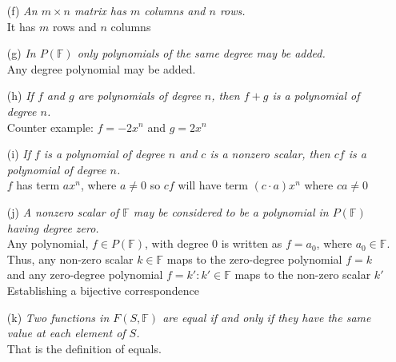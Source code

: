 \documentclass[11pt, fleqn]{article}
\begin{document}
\begin{itemize}
\begin{itemize}
        \item[(f)] \textit{An $m \times n$ matrix has $m$ columns and $n$ rows.}\\[1ex]
            \textbf{} It has $m$ rows and $n$ columns\vspace{2ex}
        
        \item[(g)] \textit{In $P(\mathbb{F})$ only polynomials of the same degree may be added.}\\[1ex]
            \textbf{} Any degree polynomial may be added.\vspace{2ex}
            
        \item[(h)] \textit{If $f$ and $g$ are polynomials of degree $n$, then $f + g$ is a polynomial of degree $n$.}\\[1ex]
            \textbf{} Counter example: $f = -2x^n$ and $g=2x^n$\vspace{2ex}
            
        \item[(i)] \textit{If $f$ is a polynomial of degree $n$ and $c$ is a nonzero scalar, then $cf$ is a polynomial of degree $n$.}\\[1ex]
            \textbf{} $f$ has term $ax^n$, where $a\neq0$ so $cf$ will have term $(c\cdot a) x^n$ where $ca\neq0$\vspace{2ex}
            
        \item[(j)] \textit{A nonzero scalar of $\mathbb{F}$ may be considered to be a polynomial in $P(\mathbb{F})$ having degree zero.}\\[1ex]
            \textbf{} Any polynomial, $f \in P(\mathbb{F})$, with degree $0$ is written as $f = a_0$, where $a_0 \in \mathbb{F}$. Thus, any non-zero scalar $k \in \mathbb{F}$ maps to the zero-degree polynomial $f=k$ and any zero-degree polynomial $f = k' : k' \in \mathbb{F}$ maps to the non-zero scalar $k'$ Establishing a bijective correspondence\vspace{2ex}
            
        \item[(k)] \textit{Two functions in $F(S, \mathbb{F})$ are equal if and only if they have the same value at each element of $S$.}\\[1ex]
            \textbf{} That is the definition of equals.
    \end{itemize}
    

\end{itemize}
\end{document}
